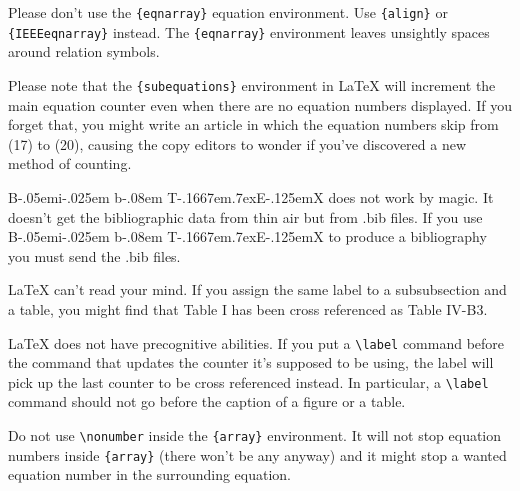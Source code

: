 \documentclass[conference]{IEEEtran}
\def\BibTeX{{\rm B\kern-.05em{\sc i\kern-.025em b}\kern-.08em
    T\kern-.1667em\lower.7ex\hbox{E}\kern-.125emX}}
\begin{document}
Please don't use the \verb|{eqnarray}| equation environment. Use
\verb|{align}| or \verb|{IEEEeqnarray}| instead. The \verb|{eqnarray}|
environment leaves unsightly spaces around relation symbols.

Please note that the \verb|{subequations}| environment in {\LaTeX}
will increment the main equation counter even when there are no
equation numbers displayed. If you forget that, you might write an
article in which the equation numbers skip from (17) to (20), causing
the copy editors to wonder if you've discovered a new method of
counting.

{\BibTeX} does not work by magic. It doesn't get the bibliographic
data from thin air but from .bib files. If you use {\BibTeX} to produce a
bibliography you must send the .bib files. 

{\LaTeX} can't read your mind. If you assign the same label to a
subsubsection and a table, you might find that Table I has been cross
referenced as Table IV-B3. 

{\LaTeX} does not have precognitive abilities. If you put a
\verb|\label| command before the command that updates the counter it's
supposed to be using, the label will pick up the last counter to be
cross referenced instead. In particular, a \verb|\label| command
should not go before the caption of a figure or a table.

Do not use \verb|\nonumber| inside the \verb|{array}| environment. It
will not stop equation numbers inside \verb|{array}| (there won't be
any anyway) and it might stop a wanted equation number in the
surrounding equation.
\end{document}

